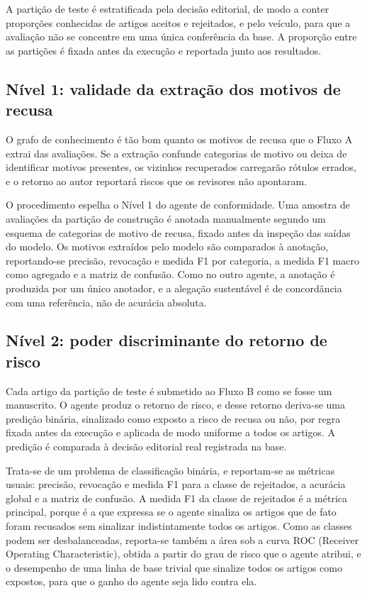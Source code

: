 A partição de teste é estratificada pela decisão editorial, de modo a conter proporções conhecidas de artigos aceitos e rejeitados, e pelo veículo, para que a avaliação não se concentre em uma única conferência da base. A proporção entre as partições é fixada antes da execução e reportada junto aos resultados.

\subsection{Nível 1: validade da extração dos motivos de recusa}
\label{sec:nivel1-fronteira}

O grafo de conhecimento é tão bom quanto os motivos de recusa que o Fluxo A extrai das avaliações. Se a extração confunde categorias de motivo ou deixa de identificar motivos presentes, os vizinhos recuperados carregarão rótulos errados, e o retorno ao autor reportará riscos que os revisores não apontaram.

O procedimento espelha o Nível 1 do agente de conformidade. Uma amostra de avaliações da partição de construção é anotada manualmente segundo um esquema de categorias de motivo de recusa, fixado antes da inspeção das saídas do modelo. Os motivos extraídos pelo modelo são comparados à anotação, reportando-se precisão, revocação e medida F1 por categoria, a medida F1 macro como agregado e a matriz de confusão. Como no outro agente, a anotação é produzida por um único anotador, e a alegação sustentável é de concordância com uma referência, não de acurácia absoluta.

\subsection{Nível 2: poder discriminante do retorno de risco}
\label{sec:nivel2-fronteira}

Cada artigo da partição de teste é submetido ao Fluxo B como se fosse um manuscrito. O agente produz o retorno de risco, e desse retorno deriva-se uma predição binária, sinalizado como exposto a risco de recusa ou não, por regra fixada antes da execução e aplicada de modo uniforme a todos os artigos. A predição é comparada à decisão editorial real registrada na base.

Trata-se de um problema de classificação binária, e reportam-se as métricas usuais: precisão, revocação e medida F1 para a classe de rejeitados, a acurácia global e a matriz de confusão. A medida F1 da classe de rejeitados é a métrica principal, porque é a que expressa se o agente sinaliza os artigos que de fato foram recusados sem sinalizar indistintamente todos os artigos. Como as classes podem ser desbalanceadas, reporta-se também a área sob a curva ROC (Receiver Operating Characteristic), obtida a partir do grau de risco que o agente atribui, e o desempenho de uma linha de base trivial que sinalize todos os artigos como expostos, para que o ganho do agente seja lido contra ela.

